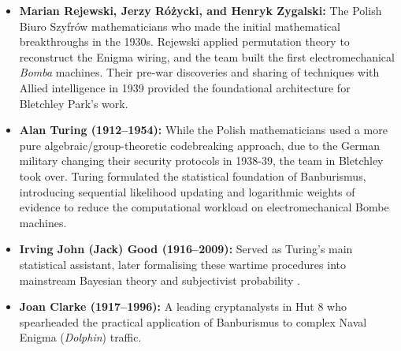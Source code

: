 \begin{itemize}
    \item \textbf{Marian Rejewski, Jerzy Różycki, and Henryk Zygalski:} The Polish Biuro Szyfrów mathematicians who made the initial mathematical breakthroughs in the 1930s. Rejewski applied permutation theory to reconstruct the Enigma wiring, and the team built the first electromechanical \emph{Bomba} machines. Their pre-war discoveries and sharing of techniques with Allied intelligence in 1939 provided the foundational architecture for Bletchley Park's work. 
    
    \item \textbf{Alan Turing (1912--1954):}
    While the Polish mathematicians used a more pure algebraic/group-theoretic codebreaking approach, due to the German military changing their security protocols in 1938-39, the team in Bletchley took over. Turing formulated the statistical foundation of Banburismus, introducing sequential likelihood updating and logarithmic weights of evidence to reduce the computational workload on electromechanical Bombe machines. 
    \item \textbf{Irving John (Jack) Good (1916--2009):} Served as Turing's main statistical assistant, later formalising these wartime procedures into mainstream Bayesian theory and subjectivist probability \cite{good1950,good1983}.
    \item \textbf{Joan Clarke (1917--1996):} A leading cryptanalysts in Hut 8 who spearheaded the practical application of Banburismus to complex Naval Enigma (\emph{Dolphin}) traffic.
\end{itemize}






